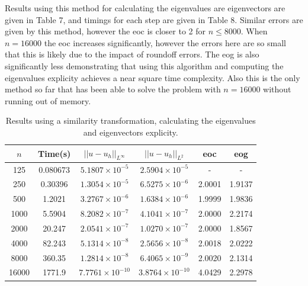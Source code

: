 \documentclass{article}
\numberwithin{equation}{section}
\begin{document}
Results using this method for calculating the eigenvalues are eigenvectors are given in Table 7, and timings for each step are given in Table 8. Similar errors are given by this method, however the eoc is  closer to 2 for $n \leq 8000$. When $n=16000$ the eoc increases significantly, however the errors here are so small that this is likely due to the impact of roundoff errors. The eog is also significantly less demonstrating that using this algorithm and computing the eigenvalues explicity achieves a near square time complexity. Also this is the only method so far that has been able to solve the problem with $n=16000$ without running out of memory. 

\begin{table}[H]
\centering
\begin{tabular}{|c|c|c|c|c|c|}
\hline
$n$ & Time(s) & $|| u - u_h ||_{L^{\infty}}$ &$|| u - u_h ||_{L^{2}}$ & eoc & eog\\
\hline
125 & 0.080673 & $5.1807 \times 10^{-5}$ & $2.5904 \times 10^{-5}$ & - & -  \\
250 & 0.30396 & $1.3054 \times 10^{-5}$ & $6.5275 \times 10^{-6}$ & 2.0001 & 1.9137  \\
500 & 1.2021 & $3.2767 \times 10^{-6}$ & $1.6384 \times 10^{-6}$ & 1.9999 & 1.9836 \\
1000 & 5.5904 & $8.2082 \times 10^{-7}$ & $4.1041 \times 10^{-7}$ & 2.0000 & 2.2174  \\
2000 & 20.247 & $2.0541 \times 10^{-7}$ & $1.0270 \times 10^{-7}$ & 2.0000 & 1.8567 \\
4000 & 82.243 & $5.1314 \times 10^{-8}$ & $2.5656 \times 10^{-8}$ & 2.0018 & 2.0222  \\
8000 & 360.35 & $1.2814 \times 10^{-8}$ & $6.4065 \times 10^{-9}$ & 2.0020 & 2.1314  \\
16000 & 1771.9 & $7.7761 \times 10^{-10}$ & $3.8764 \times 10^{-10}$ & 4.0429 & 2.2978 \\
\hline
\end{tabular}
\captionsetup{justification=centering}
\caption{Results using a similarity transformation, calculating the eigenvalues and eigenvectors explicity.}
\end{table}
\end{document}
